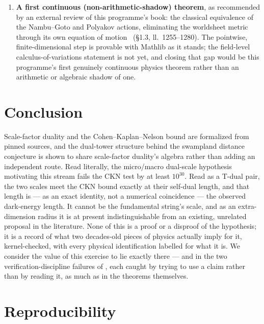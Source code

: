 \documentclass[11pt,a4paper]{article}
\theoremstyle{remark}
\begin{document}
\begin{enumerate}
theorem in this paper had to be checked by hand against the vacuity failure of .
\item \textbf{A first continuous (non-arithmetic-shadow) theorem}, as recommended by an external
review of this programme's book: the classical equivalence of the Nambu--Goto and Polyakov
actions, eliminating the worldsheet metric through its own equation of motion~\cite{Tong2009}
(§1.3, ll.~1255--1280). The pointwise, finite-dimensional step is provable with Mathlib as it
stands; the field-level calculus-of-variations statement is not yet, and closing that gap would be
this programme's first genuinely continuous physics theorem rather than an arithmetic or algebraic
shadow of one.
\end{enumerate}

\section{Conclusion}
\label{sec:conclusion}
Scale-factor duality and the Cohen--Kaplan--Nelson bound are formalized from pinned sources, and
the dual-tower structure behind the swampland distance conjecture is shown to share scale-factor
duality's algebra rather than adding an independent route. Read literally, the micro/macro
dual-scale hypothesis motivating this stream fails the CKN test by at least $10^{30}$. Read as a
T-dual pair, the two scales meet the CKN bound exactly at their self-dual length, and that length
is --- as an exact identity, not a numerical coincidence --- the observed dark-energy length. It
cannot be the fundamental string's scale, and as an extra-dimension radius it is at present
indistinguishable from an existing, unrelated proposal in the literature. None of this is a proof
or a disproof of the hypothesis; it is a record of what two decades-old pieces of physics actually
imply for it, kernel-checked, with every physical identification labelled for what it is. We
consider the value of this exercise to lie exactly there --- and in the two verification-discipline
failures of , each caught by trying to use a claim rather than by reading it, as
much as in the theorems themselves.

\appendix
\section{Reproducibility}
\label{app:repro}
\end{document}
